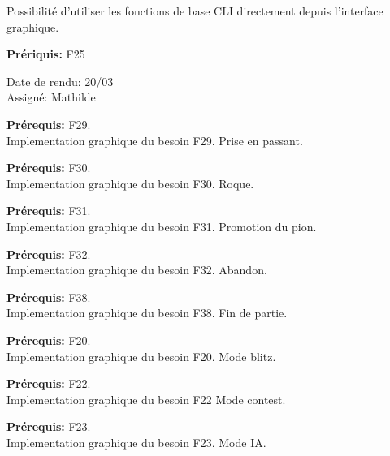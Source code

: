 \documentclass{article}
\begin{document}
\begin{needbox}
    Possibilité d'utiliser les fonctions de base CLI directement depuis l'interface graphique.

    \textbf{Prériquis:} F25
    \begin{duedatebox}
        Date de rendu: 20/03\\
        Assigné: Mathilde
    \end{duedatebox}
    \begin{subneedbox}
        \textbf{Prérequis:} F29.\\
        Implementation graphique du besoin F29. Prise en passant.
    \end{subneedbox}
    \begin{subneedbox}[F46.2: Roque]
        \textbf{Prérequis:} F30.\\
        Implementation graphique du besoin F30. Roque.
    \end{subneedbox}
    \begin{subneedbox}[F46.3: Promotion]
        \textbf{Prérequis:} F31.\\
        Implementation graphique du besoin F31. Promotion du pion.
    \end{subneedbox}
    \begin{subneedbox}[F46.4: Abandon]
        \textbf{Prérequis:} F32.\\
        Implementation graphique du besoin F32. Abandon.
    \end{subneedbox}
    \begin{subneedbox}
        \textbf{Prérequis:} F38.\\
        Implementation graphique du besoin F38. Fin de partie.
    \end{subneedbox}
    \begin{subneedbox}
        \textbf{Prérequis:} F20.\\
        Implementation graphique du besoin F20. Mode blitz.
    \end{subneedbox}
    \begin{subneedbox}
        \textbf{Prérequis:} F22.\\
        Implementation graphique du besoin F22 Mode contest.
    \end{subneedbox}
    \begin{subneedbox}[F46.8: Mode IA]
        \textbf{Prérequis:} F23.\\
        Implementation graphique du besoin F23. Mode IA.
    \end{subneedbox}
    
\end{needbox}
\end{document}
